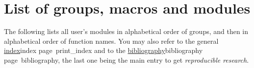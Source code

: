%
%


\part{List of groups, macros and modules}
\label{part_list}

The following lists all user's modules in alphabetical order of groups, 
and then in alphabetical order of function names.
You may also refer to the general \hyperref[pageref]{index}{index page~}{}{print_index}
and to the \hyperref[pageref]{bibliography}{bibliography page~}{}{bibliography}, 
the last one being the main entry to get {\em reproducible research}.

